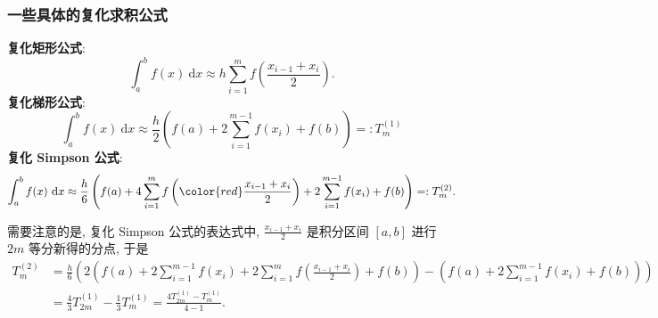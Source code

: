 
\begin{frame}
\frametitle{一些具体的复化求积公式}

\textbf{复化矩形公式}:
\[
\int_a^b f(x) ~ \mathrm{d}x \approx h \sum_{i=1}^m f\left( \frac{x_{i-1} + x_i}{2} \right).
\]
\textbf{复化梯形公式}:
\[
\int_a^b f(x) ~ \mathrm{d}x \approx \frac{h}{2} \left( f(a) + 2 \sum_{i=1}^{m-1} f(x_i) + f(b) \right) =: T_m^{(1)}
\]
\textbf{复化 Simpson 公式}:
\[
\int_a^b f(x) ~ \mathrm{d}x \approx \frac{h}{6} \left( f(a) + 4 \sum_{i=1}^m f\left( {\color{red}\frac{x_{i-1} + x_i}{2}} \right) + 2 \sum_{i=1}^{m-1} f(x_i) + f(b) \right) =: T_m^{(2)}.
\]

\pause

需要注意的是, 复化 Simpson 公式的表达式中, $\frac{x_{i-1} + x_i}{2}$ 是积分区间 $[a, b]$ 进行 $2m$ 等分\alert{新得的分点}, 于是
\begin{align*}
T_m^{(2)} & = \frac{h}{6} \left( 2\left( f(a) + 2\sum_{i=1}^{m-1} f(x_i) + 2\sum_{i=1}^m f\left( \frac{x_{i-1} + x_i}{2} \right) + f(b) \right) - \left( f(a) + 2\sum_{i=1}^{m-1} f(x_i) + f(b) \right) \right) \\
& = \frac{4}{3} T_{2m}^{(1)} - \frac{1}{3} T_m^{(1)} = \frac{4 T_{2m}^{(1)} - T_m^{(1)}}{4 - 1}.
\end{align*}

\end{frame}


